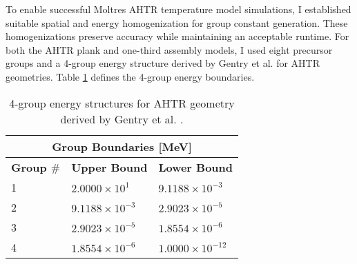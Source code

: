 To enable successful Moltres \gls{AHTR} temperature model simulations, I established 
suitable spatial and energy homogenization for group constant generation. 
These homogenizations preserve accuracy while maintaining an acceptable runtime.
For both the \gls{AHTR} plank and one-third assembly models, I used eight precursor 
groups and a 4-group energy structure derived by Gentry et al. 
\cite{gentry_development_2016} for \gls{AHTR} geometries. 
Table \ref{tab:energy_structures} defines the 4-group energy boundaries. 
\begin{table}[htbp]
    \centering
    \onehalfspacing
    \caption{4-group energy structures for \acrfull{AHTR} geometry 
    derived by Gentry et al. \cite{gentry_development_2016}.}
	\label{tab:energy_structures}
    \footnotesize
    \begin{tabular}{lll}
    \hline
    \multicolumn{3}{c}{\textbf{Group Boundaries [MeV]}} \\ 
    \hline
    \textbf{Group $\#$}& \textbf{Upper Bound} & \textbf{Lower Bound}  \\
    \hline 
    1 & $2.0000\times 10^1$ & $9.1188\times 10^{-3}$ \\ 
    2 & $9.1188\times 10^{-3}$ & $2.9023\times 10^{-5}$\\
    3 & $2.9023\times 10^{-5}$ & $1.8554\times 10^{-6}$\\
    4 & $1.8554\times 10^{-6}$ & $1.0000\times 10^{-12}$\\
    \hline
    \end{tabular}
\end{table}

